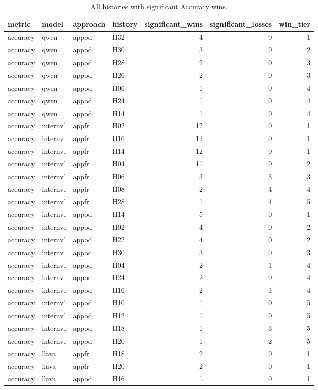 \begin{table}[tbp]
\caption{All histories with significant Accuracy wins.}
\label{tab:rq3-accuracy-significant-history-wins}
\begin{tabular}{llllrrr}
\toprule
metric & model & approach & history & significant\_wins & significant\_losses & win\_tier \\
\midrule
accuracy & qwen & appod & H32 & 4 & 0 & 1 \\
accuracy & qwen & appod & H30 & 3 & 0 & 2 \\
accuracy & qwen & appod & H28 & 2 & 0 & 3 \\
accuracy & qwen & appod & H26 & 2 & 0 & 3 \\
accuracy & qwen & appod & H06 & 1 & 0 & 4 \\
accuracy & qwen & appod & H24 & 1 & 0 & 4 \\
accuracy & qwen & appod & H14 & 1 & 0 & 4 \\
accuracy & internvl & appfr & H02 & 12 & 0 & 1 \\
accuracy & internvl & appfr & H16 & 12 & 0 & 1 \\
accuracy & internvl & appfr & H14 & 12 & 0 & 1 \\
accuracy & internvl & appfr & H04 & 11 & 0 & 2 \\
accuracy & internvl & appfr & H06 & 3 & 3 & 3 \\
accuracy & internvl & appfr & H08 & 2 & 4 & 4 \\
accuracy & internvl & appfr & H28 & 1 & 4 & 5 \\
accuracy & internvl & appod & H14 & 5 & 0 & 1 \\
accuracy & internvl & appod & H02 & 4 & 0 & 2 \\
accuracy & internvl & appod & H22 & 4 & 0 & 2 \\
accuracy & internvl & appod & H30 & 3 & 0 & 3 \\
accuracy & internvl & appod & H04 & 2 & 1 & 4 \\
accuracy & internvl & appod & H24 & 2 & 0 & 4 \\
accuracy & internvl & appod & H16 & 2 & 1 & 4 \\
accuracy & internvl & appod & H10 & 1 & 0 & 5 \\
accuracy & internvl & appod & H12 & 1 & 0 & 5 \\
accuracy & internvl & appod & H18 & 1 & 3 & 5 \\
accuracy & internvl & appod & H20 & 1 & 2 & 5 \\
accuracy & llava & appfr & H18 & 2 & 0 & 1 \\
accuracy & llava & appfr & H20 & 2 & 0 & 1 \\
accuracy & llava & appod & H16 & 1 & 0 & 1 \\
\bottomrule
\end{tabular}
\end{table}
